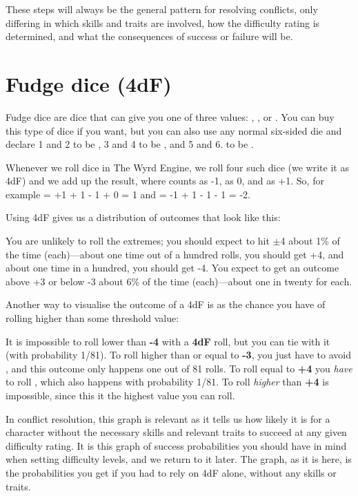 These steps will always be the general pattern for resolving conflicts, only differing in which skills and traits are involved, how the difficulty rating is determined, and what the consequences of success or failure will be.

\section{Fudge dice (4dF)}\label{core:fudge-dice}

Fudge dice are dice that can give you one of three values: \FudgeDie{-}, \FudgeDie{}, or \FudgeDie{+}. You can buy this type of dice if you want, but you can also use any normal six-sided die and declare 1 and 2 to be \FudgeDie{-}, 3 and 4 to be \FudgeDie{}, and 5 and 6. to be \FudgeDie{+}.

Whenever we roll dice in The Wyrd Engine, we roll four such dice (we write it as 4dF) and we add up the result, where \FudgeDie{-} counts as -1, \FudgeDie{} as 0, and \FudgeDie{+} as +1. So, for example
	 = +1 + 1 - 1 + 0 = 1
	and 
	\FudgeRes{-+--} = -1 + 1 - 1 - 1 = -2.

Using 4dF gives us a distribution of outcomes that look like this:

You are unlikely to roll the extremes; you should expect to hit $\pm$4 about 1\% of the time (each)---about one time out of a hundred rolls, you should get +4, and about one time in a hundred, you should get -4. You expect to get an outcome above +3 or below -3 about 6\% of the time (each)---about one in twenty for each.

Another way to visualise the outcome of a 4dF is as the chance you have of rolling higher than some threshold value:


It is impossible to roll lower than \textbf{-4} with a \textbf{4dF} roll, but you can tie with it (with probability 1/81).
To roll higher than or equal to \textbf{-3}, you just have to avoid \FudgeRes{----}, and this outcome only happens one out of 81 rolls. To roll equal to \textbf{+4} you \emph{have} to roll \FudgeRes{++++}, which also happens with probability 1/81. To roll \emph{higher} than \textbf{+4} is impossible, since this it the highest value you can roll.

In conflict resolution, this graph is relevant as it tells us how likely it is for a character without the necessary skills and relevant traits to succeed at any given difficulty rating. It is this graph of success probabilities you should have in mind when setting difficulty levels, and we return to it later. The graph, as it is here, is the probabilities you get if you had to rely on 4dF alone, without any skills or traits.

